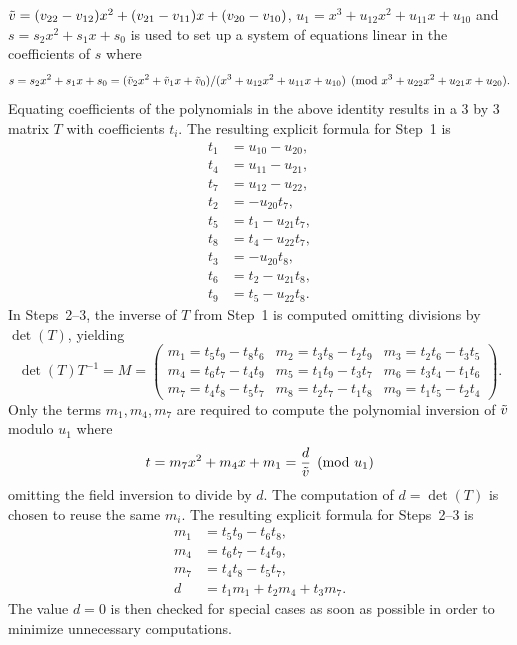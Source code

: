 $\tilde{v} = (v_{22} - v_{12})x^2 + (v_{21} - v_{11})x + (v_{20} - v_{10})$, $u_1 =
x^3 + u_{12}x^2 + u_{11}x + u_{10}$ and $s = s_2x^2 + s_1x + s_0$ is used to set
up a system of equations linear in the coefficients of $s$ where
$$s = s_2x^2 + s_1x + s_0 = (\tilde{v}_2x^2 + \tilde{v}_1x + \tilde{v}_0)/(x^3 + u_{12}x^2 +
u_{11}x + u_{10}) \pmod{x^3 + u_{22}x^2 + u_{21}x + u_{20}}.$$ Equating
coefficients of the polynomials in the above identity results in a 3 by 3
matrix $T$ with coefficients $t_i$. The resulting explicit formula for
Step~1 is
\begin{align*}
    t_1 &= u_{10} - u_{20},\\
    t_4 &= u_{11} - u_{21},\\
    t_7 &= u_{12} - u_{22},\\
    t_2 &= -u_{20}t_7,\\
    t_5 &= t_1 - u_{21}t_7,\\
    t_8 &= t_4 - u_{22}t_7,\\
    t_3 &= -u_{20}t_8,\\
    t_6 &= t_2 - u_{21}t_8,\\
    t_9 &= t_5 - u_{22}t_8.
\end{align*}
In Steps~2--3, the inverse of $T$ from Step~1 is computed omitting divisions by
$\det(T)$, yielding 
$$ \det(T)T^{-1} = M = \left( \begin{array}{ccc}
m_1 = t_5t_9 - t_8t_6 & m_2 = t_3t_8 - t_2t_9 & m_3 = t_2t_6 - t_3t_5  \\
m_4 = t_6t_7 - t_4t_9 & m_5 = t_1t_9 - t_3t_7 & m_6 = t_3t_4 - t_1t_6  \\
m_7 = t_4t_8 - t_5t_7 & m_8 = t_2t_7 - t_1t_8 & m_9 = t_1t_5 - t_2t_4
\end{array} \right).$$ Only the terms $m_1,m_4,m_7$ are required to compute the
polynomial inversion of $\tilde{v}$ modulo $u_1$ where $$ t = m_7x^2 + m_4x + m_1 =
\frac{d}{\tilde{v}} \pmod{u_1}$$ omitting the field inversion to divide by $d$. The
computation of $d = \det(T)$ is chosen to reuse the same $m_i$. The resulting
explicit formula for Steps~2--3 is
\begin{align*}
    m_1 &= t_5t_9 - t_6t_8,\\
    m_4 &= t_6t_7 - t_4t_9,\\
    m_7 &= t_4t_8 - t_5t_7,\\
    d   &= t_1m_1 + t_2m_4 + t_3m_7. 
\end{align*} 
The value $d = 0$ is then checked for special cases as soon as possible in order
to minimize unnecessary computations. 

